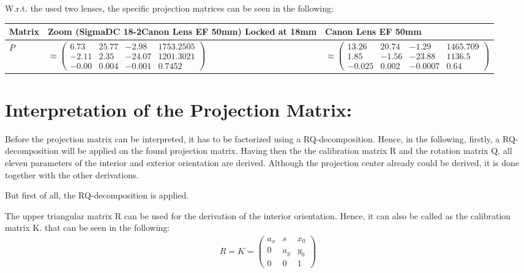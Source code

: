 \documentclass[a4paper,headings=small]{scrartcl}
\numberwithin{equation}{section} %
\numberwithin{figure}{section}   %
\begin{document}
W.r.t. the used two lenses, the specific projection matrices can be seen in the following:

\begin{tabular}{ l || p{7cm} || p{6cm}}
      Matrix & Zoom (SigmaDC 18-2Canon Lens EF 50mm) Locked at 18mm & Canon Lens EF 50mm \\
      \hline
      $P$ & $\approx
\left( \begin{array}{cccc}
 6.73    & 25.77     &  -2.98    & 1753.2505    \\
-2.11    &  2.35     & -24.07    & 1201.3021    \\
-0.00    &  0.004     &  -0.001   &    0.7452
\end{array} \right)$  &  
$\approx
\left( \begin{array}{cccc}
13.26    & 20.74    &  -1.29  & 1465.709 \\
1.85     & -1.56    & -23.88  & 1136.5 \\
-0.025    &  0.002    &  -0.0007  &    0.64
\end{array} \right)$  \\
\end{tabular}


\section{Interpretation of the Projection Matrix:}

Before the projection matrix can be interpreted, it has to be factorized using a RQ-decomposition.
Hence, in the following, firstly, a RQ-decomposition will be applied on the found projection matrix.
Having then the the calibration matrix R and the rotation matrix Q,
all eleven parameters of the interior and exterior orientation are derived.
Although the projection center already could be derived, it is done together with the other derivations.

But first of all, the RQ-decomposition is applied.

The upper triangular matrix R can be used for the derivation of the interior orientation.
Hence, it can also be called as the calibration matrix K. that can be seen in the following:
\begin{align}
R=K=
\left( \begin{array}{ccc}
a_x & s   & x_0 \\
0   & a_y & y_0 \\
0   & 0   & 1
\end{array} \right) 
\end{align}
\end{document}
